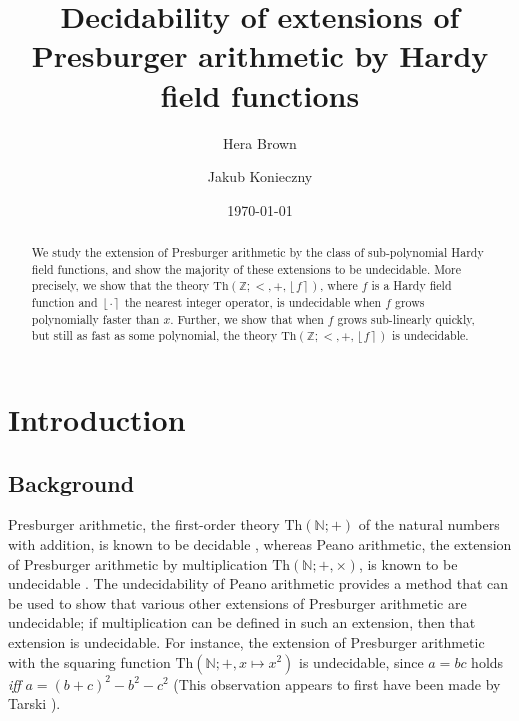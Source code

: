 \documentclass{amsart}
\theoremstyle{definition}
\newcommand{\nint}[1]{\left\lfloor #1 \right\rceil}
\newcommand{\NN}{\mathbb{N}}
\newcommand{\ZZ}{\mathbb{Z}}
\newcommand{\mynote}[2]{\noindent{\bfseries\sffamily\scriptsize#1}{\small$\blacktriangleright$\textsf{\textsl{#2}}$\blacktriangleleft$}}
\newcommand\JK[1]{\mynote{JK}{{\color[rgb]{0.5,0.2,0.0} #1}}}
\newcommand\HB[1]{\mynote{HB}{{\color[rgb]{0.0,0.5,0.2} #1}}}
\newcommand{\theory}[1]{\mathrm{Th}(#1)}
\begin{document}
 
\author[H.\ Brown]{Hera Brown}
\address{Department of Computer Science, University of Oxford,
Wolfson Building, Parks Road, Oxford OX1 3QD, UK}

\author[J.\ Konieczny]{Jakub Konieczny}
\address{Department of Computer Science, University of Oxford,
Wolfson Building, Parks Road, Oxford OX1 3QD, UK}

\renewcommand{\JK}[1]{}
\renewcommand{\HB}[1]{}
\renewcommand{\checkmark}{}
 
\title[Hardy field extensions of Presburger arithmetic]{Decidability of extensions of Presburger arithmetic by Hardy field functions}
\date{\today}
 
\begin{abstract}
We study the extension of Presburger arithmetic by the class of sub-polynomial Hardy field functions, and show the majority of these extensions to be undecidable. More precisely, we show that the theory $\theory{\ZZ; <, +, \nint{f}}$, where $f$ is a Hardy field function and $\nint{\cdot}$ the nearest integer operator, is undecidable when $f$ grows polynomially faster than $x$. Further, we show that when $f$ grows sub-linearly quickly, but still as fast as some polynomial, the theory $\theory{\ZZ; <, +, \nint{f}}$ is undecidable.
\end{abstract}
 
\keywords{}
 
\maketitle 

\section{$\checkmark$Introduction}
\label{sec:intro}

\newcommand{\Th}{\mathrm{Th}}

\subsection{$\checkmark$Background}
Presburger arithmetic, the first-order theory $\theory{\NN; +}$ of the natural numbers with addition, is known to be decidable \cite{Presburger-1929}, whereas Peano arithmetic, the extension of Presburger arithmetic by multiplication $\theory{\NN; +, \times}$, is known to be undecidable \cite{Church-1936}. The undecidability of Peano arithmetic provides a method that can be used to show that various other extensions of Presburger arithmetic are undecidable; if multiplication can be defined in such an extension, then that extension is undecidable. For instance, the extension of Presburger arithmetic with the squaring function $\theory{\NN; +, x \mapsto x^2}$ is undecidable, since $a = bc$ holds \emph{iff} $a = (b+c)^2 - b^2 - c^2$ (This observation appears to first have been made by Tarski \cite{Tarski-1953}). 
\end{document}
